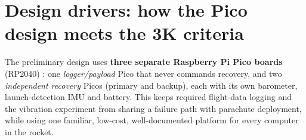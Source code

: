 \section{Design drivers: how the Pico design meets the 3K criteria}
The preliminary design uses \textbf{three separate Raspberry Pi Pico boards} (RP2040) \cite{picods,rp2040ds}: one \emph{logger/payload} Pico that never commands recovery, and two \emph{independent recovery} Picos (primary and backup), each with its own barometer, launch-detection IMU and battery. This keeps required flight-data logging and the vibration experiment from sharing a failure path with parachute deployment, while using one familiar, low-cost, well-documented platform for every computer in the rocket.

